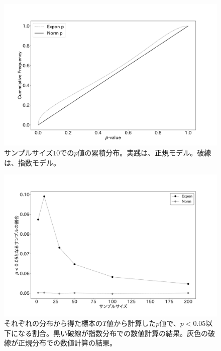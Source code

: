 \begin{figure}
 \begin{center}
  \includegraphics[width=15cm]{./image/04_/N_10_Exponn_T_test.pdf}
  \caption{サンプルサイズ$10$での$p$値の累積分布。実践は、正規モデル。破線は、指数モデル。}
  \label{fig:model_dependent_T_test}
 \end{center}
\end{figure}


\begin{figure}
 \begin{center}
  \includegraphics[width=15cm]{./image/04_/t_test_expon_norm.pdf}
  \caption{それぞれの分布から得た標本の$T$値から計算した$p$値で、$p<0.05$以下になる割合。黒い破線が指数分布での数値計算の結果。灰色の破線が正規分布での数値計算の結果。}
  \label{fig:t_test_expon_norm}
 \end{center}
\end{figure}

